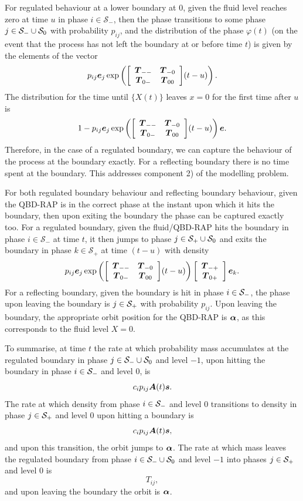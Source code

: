 For regulated behaviour at a lower boundary at \(0\), given the fluid level reaches zero at time \(u\) in phase \(i\in\mathcal S_-\), then the phase transitions to some phase \(j\in\mathcal{S}_-\cup\mathcal{S}_0\) with probability \(p_{ij}\), and the distribution of the phase \(\varphi(t)\) (on the event that the process has not left the boundary at or before time \(t\)) is given by the elements of the vector
\[p_{ij} \boldsymbol e_j \exp\left({\left[\begin{array}{cc} \boldsymbol T_{--} & \boldsymbol T_{-0} \\ \boldsymbol T_{0-} & \boldsymbol T_{00}\end{array}\right]}(t-u)\right).\] 
The distribution for the time until \(\{X(t)\}\) leaves \(x=0\) for the first time after \(u\) is 
\[1-p_{ij}\boldsymbol e_j \exp\left({\left[\begin{array}{cc} \boldsymbol T_{--} & \boldsymbol T_{-0} \\ \boldsymbol T_{0-} & \boldsymbol T_{00}\end{array}\right]}(t-u)\right)\boldsymbol e.\] 
Therefore, in the case of a regulated boundary, we can capture the behaviour of the process at the boundary exactly. For a reflecting boundary there is no time spent at the boundary. This addresses component 2) of the modelling problem. 

For both regulated boundary behaviour and reflecting boundary behaviour, given the QBD-RAP is in the correct phase at the instant upon which it hits the boundary, then upon exiting the boundary the phase can be captured exactly too. For a regulated boundary, given the fluid/QBD-RAP hits the boundary in phase \(i\in\mathcal S_-\) at time \(t\), it then jumps to phase \(j\in\mathcal{S}_+\cup\mathcal{S}_0\) and exits the boundary in phase \(k\in\mathcal S_+\) at time \((t-u)\) with density 
\[p_{ij}\boldsymbol e_j \exp\left({\left[\begin{array}{cc} \boldsymbol T_{--} & \boldsymbol T_{-0} \\ \boldsymbol T_{0-} & \boldsymbol T_{00}\end{array}\right]}(t-u)\right)\left[\begin{array}{c} \boldsymbol T_{-+} \\ \boldsymbol T_{0+}\end{array}\right]\boldsymbol e_k.\] 
For a reflecting boundary, given the boundary is hit in phase \(i\in\mathcal{S}_-\), the phase upon leaving the boundary is \(j\in\mathcal{S}_+\) with probability \(p_{ij}\). Upon leaving the boundary, the appropriate orbit position for the QBD-RAP is \(\boldsymbol \alpha\), as this corresponds to the fluid level \(X=0\). 

To summarise, at time \(t\) the rate at which probability mass accumulates at the regulated boundary in phase \(j \in\mathcal{S}_-\cup\mathcal{S}_0\) and level \(-1\), upon hitting the boundary in phase \(i\in\mathcal{S}_-\) and level \(0\), is 
\[ c_ip_{ij} \boldsymbol A(t)\boldsymbol s.\]
The rate at which density from phase \(i\in\mathcal{S}_-\) and level \(0\) transitions to density in phase \(j\in\mathcal{S}_+\) and level \(0\) upon hitting a boundary is 
\[ c_ip_{ij} \boldsymbol A(t)\boldsymbol s,\]
and upon this transition, the orbit jumps to \(\boldsymbol \alpha\). 
The rate at which mass leaves the regulated boundary from phase \(i\in\mathcal{S}_-\cup\mathcal{S}_0\) and level \(-1\) into phases \(j\in\mathcal{S}_+\) and level \(0\) is 
\[T_{ij},\]
and upon leaving the boundary the orbit is \(\boldsymbol\alpha\). 

